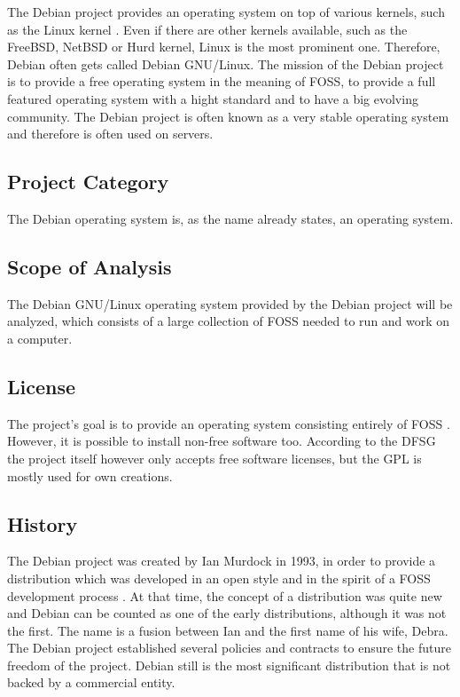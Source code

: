 The Debian project provides an operating system on top of various kernels, such
as the Linux kernel \cite{DebianAbout,DebianPorts}. Even if there are other
kernels available, such as the FreeBSD, NetBSD or Hurd kernel, Linux is the
most prominent one. Therefore, Debian often gets called Debian \ac{GNU}/Linux.
The mission of the Debian project is to provide a free operating system in the
meaning of \ac{FOSS}, to provide a full featured operating system with a hight
standard and to have a big evolving community. The Debian project is often
known as a very stable operating system and therefore is often used on servers.

\subsection{Project Category}

The Debian operating system is, as the name already states, an operating
system.

\subsection{Scope of Analysis}

The Debian \ac{GNU}/Linux operating system provided by the Debian project will
be analyzed, which consists of a large collection of \ac{FOSS} needed to run
and work on a computer.

\subsection{License}

The project's goal is to provide an operating system consisting entirely of
\ac{FOSS} \cite{DebianLicense,DebianFAQ}. However, it is possible to install
non-free software too. According to the \ac{DFSG} the project itself however
only accepts free software licenses, but the \ac{GPL} is mostly used for own
creations.

\subsection{History}

The Debian project was created by Ian Murdock in 1993, in order to provide a
distribution which was developed in an open style and in the spirit of a
\ac{FOSS} development process \cite{DebianAbout,DebianHistory,Sadowski2008}. At
that time, the concept of a distribution was quite new and Debian can be
counted as one of the early distributions, although it was not the first. The
name is a fusion between Ian and the first name of his wife, Debra. The Debian
project established several policies and contracts to ensure the future freedom
of the project. Debian still is the most significant distribution that is not
backed by a commercial entity.

